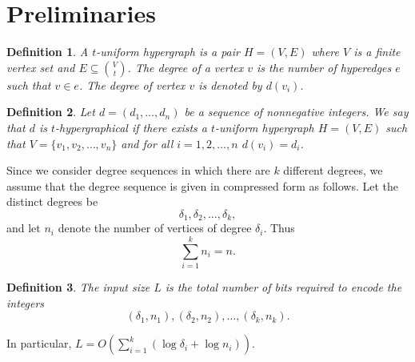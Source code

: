 \documentclass[pdflatex,sn-mathphys-num]{sn-jnl}%
\theoremstyle{thmstyleone}%
\newtheorem{theorem}{Theorem}%
\theoremstyle{thmstyletwo}%
\theoremstyle{thmstylethree}%
\newtheorem{definition}{Definition}%
\begin{document}

\section{Preliminaries}


\begin{definition}
A \emph{$t$-uniform hypergraph} is a pair $H = (V,E)$ where $V$ is a finite vertex set and $E \subseteq \binom{V}{t}$. The degree of a vertex $v$ is the number of hyperedges $e$ such that $v\in e$. The degree of vertex $v$ is denoted by $d(v_i)$.
\end{definition}

\begin{definition}
Let $d = (d_1,\dots,d_n)$ be a sequence of nonnegative integers. We say that $d$ is \emph{$t$-hypergraphical} if there exists a $t$-uniform hypergraph $H = (V,E)$ such that $V = \{v_1, v_2,\ldots,v_n\}$ and for all $i=1,2,\ldots, n$ $d(v_i) = d_i$.%
\end{definition}


Since we consider degree sequences in which there are $k$ different degrees,
we assume that the degree sequence is given in compressed form as follows. Let the distinct degrees be
\[
\delta_1, \delta_2, \dots, \delta_k,
\]
and let $n_i$ denote the number of vertices of degree $\delta_i$. Thus
\[
\sum_{i=1}^k n_i = n.
\]

\begin{definition}
The \emph{input size} $L$ is the total number of bits required to encode the integers
\[
(\delta_1,n_1), (\delta_2,n_2), \dots, (\delta_k,n_k).
\]
\end{definition}

In particular, $L = O\!\left(\sum_{i=1}^k (\log \delta_i + \log n_i)\right)$.
\end{document}
